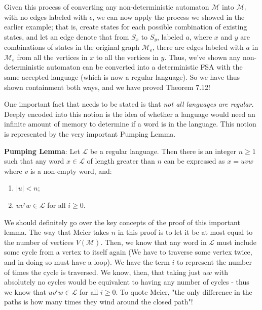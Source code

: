 \documentclass[12pt]{amsart}
\begin{document}
Given this process of converting any non-deterministic automaton $\mathcal{M}$ into $\mathcal{M}_\epsilon$ with no edges labeled with $\epsilon$, we can now apply the process we showed in the earlier example; that is, create states for each possible combination of existing states, and let an edge denote that from $S_x$ to $S_y$, labeled $a$, where $x$ and $y$ are combinations of states in the original graph $\mathcal{M}_\epsilon$, there are edges labeled with $a$ in $\mathcal{M}_\epsilon$ from all the vertices in $x$ to all the vertices in $y$. Thus, we've shown any non-deterministic automaton can be converted into a deterministic FSA with the same accepted language (which is now a regular language). So we have thus shown containment both ways, and we have proved Theorem 7.12!

One important fact that needs to be stated is that \emph{not all languages are regular.} Deeply encoded into this notion is the idea of whether a language would need an infinite amount of memory to determine if a word is in the language. This notion is represented by the very important Pumping Lemma.

\textbf{Pumping Lemma}: Let $\mathcal{L}$ be a regular language. Then there is an integer $n\geq 1$ such that any word $x\in \mathcal{L}$ of length greater than $n$ can be expressed as $x=uvw$ where $v$ is a non-empty word, and:
\begin{enumerate}
\item $|u|<n$;
\item $uv^iw\in \mathcal{L}$ for all $i\geq 0$.
\end{enumerate}

We should definitely go over the key concepts of the proof of this important lemma. The way that Meier takes $n$ in this proof is to let it be at most equal to the number of vertices $V(\mathcal{M})$. Then, we know that any word in $\mathcal{L}$ must include some cycle from a vertex to itself again (We have to traverse some vertex twice, and in doing so must have a loop). We have the term $i$ to represent the number of times the cycle is traversed. We know, then, that taking just $uw$ with absolutely no cycles would be equivalent to having any number of cycles - thus we know that $uv^iw\in \mathcal{L}$ for all $i\geq 0$. To quote Meier, "the only difference in the paths is how many times they wind around the closed path"\cite{ggt}! 
\end{document}
